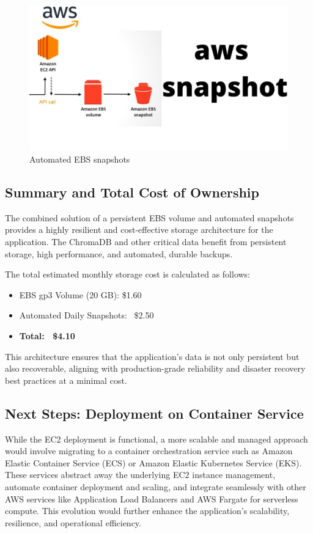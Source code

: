 \begin{center}
\begin{figure}[H]
\includegraphics[scale=0.25]{images/snapshots.jpg}
\caption{Automated EBS snapshots}
\label{fig:snapshots}
\end{figure}
\end{center}

\subsection{Summary and Total Cost of Ownership}
The combined solution of a persistent EBS volume and automated snapshots provides a highly resilient and cost-effective storage architecture for the application. The ChromaDB and other critical data benefit from persistent storage, high performance, and automated, durable backups.

The total estimated monthly storage cost is calculated as follows:
\begin{itemize}
    \item EBS gp3 Volume (20 GB): \$1.60
    \item Automated Daily Snapshots: ~\$2.50
    \item \textbf{Total: ~\$4.10}
\end{itemize}

This architecture ensures that the application's data is not only persistent but also recoverable, aligning with production-grade reliability and disaster recovery best practices at a minimal cost.

\subsection{Next Steps: Deployment on Container Service}
While the EC2 deployment is functional, a more scalable and managed approach would involve migrating to a container orchestration service such as Amazon Elastic Container Service (ECS) or Amazon Elastic Kubernetes Service (EKS). These services abstract away the underlying EC2 instance management, automate container deployment and scaling, and integrate seamlessly with other AWS services like Application Load Balancers and AWS Fargate for serverless compute. This evolution would further enhance the application's scalability, resilience, and operational efficiency.

